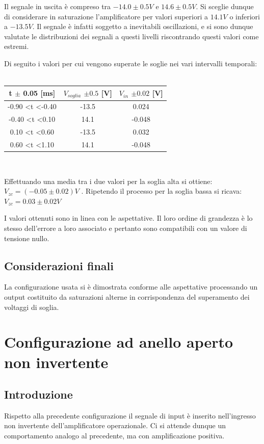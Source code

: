 \documentclass[journal]{IEEEtran}
\begin{document}
Il segnale in uscita è compreso tra $-14.0 \pm 0.5 V $  e $14.6 \pm 0.5 V$.
Si sceglie dunque di considerare in saturazione l'amplificatore per valori superiori a $14.1 V$ o inferiori a $-13.5 V$. Il segnale è infatti soggetto a inevitabili
oscillazioni, e si sono dunque valutate le distribuzioni dei segnali a questi livelli riscontrando questi valori come estremi.

Di seguito i valori per cui vengono superate le soglie nei vari intervalli temporali:
\
\newline

\begin{tabular}{|c|c|c|}
\hline
    t $\pm$ 0.05 {[}ms{]} & $V_{soglia}$ $\pm 0.5$ {[}V{]} & $V_{in}$ $\pm 0.02$ {[}V{]} \\ \hline
-0.90 \textless t \textless -0.40 & -13.5 & 0.024  \\ \hline
-0.40 \textless t \textless 0.10  & 14.1  & -0.048 \\ \hline
0.10 \textless t \textless 0.60   & -13.5 & 0.032  \\ \hline
0.60 \textless t \textless 1.10   & 14.1  & -0.048 \\  \hline
\end{tabular}\\
\newline

Effettuando una media tra i due valori per la soglia alta si ottiene: $V_{zc} = (-0.05 \pm 0.02) V$ .
Ripetendo il processo per la soglia bassa si ricava: $V_{zc} = 0.03 \pm 0.02 V$

I valori ottenuti sono in linea con le aspettative. Il loro ordine di grandezza è lo stesso dell'errore a loro associato e pertanto sono compatibili con un valore di tensione nullo.
\subsection{\textbf{Considerazioni finali}}
La configurazione usata si è dimostrata conforme alle aspettative processando un output costituito da saturazioni alterne in corrispondenza del superamento dei voltaggi di soglia. 

\section{\textbf{Configurazione ad anello aperto non invertente}} %
\subsection{\textbf{Introduzione}}
Rispetto alla precedente configurazione il segnale di input è inserito nell'ingresso non invertente dell'amplificatore operazionale.
Ci si attende dunque un comportamento analogo al precedente, ma con amplificazione positiva.
\end{document}
